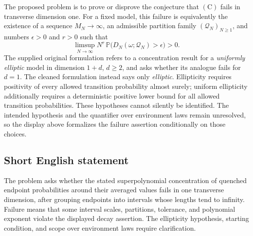 \documentclass[11pt]{article}
\begin{document}
The proposed problem is to prove or disprove the conjecture that \((\mathrm C)\) fails in transverse dimension one. For a fixed model, this failure is equivalently the existence of a sequence \(M_N\to\infty\), an admissible partition family \((\mathcal Q_N)_{N\geq1}\), and numbers \(\epsilon>0\) and \(r>0\) such that
\[
\limsup_{N\to\infty}N^r\,
\mathbb P\bigl(D_N(\omega;\mathcal Q_N)>\epsilon\bigr)>0.
\]
The supplied original formulation refers to a concentration result for a \emph{uniformly elliptic} model in dimension \(1+d\), \(d\geq2\), and asks whether its analogue fails for \(d=1\). The cleaned formulation instead says only \emph{elliptic}. Ellipticity requires positivity of every allowed transition probability almost surely; uniform ellipticity additionally requires a deterministic positive lower bound for all allowed transition probabilities. These hypotheses cannot silently be identified. The intended hypothesis and the quantifier over environment laws remain unresolved, so the display above formalizes the failure assertion conditionally on those choices.
\subsection{Short English statement}
The problem asks whether the stated superpolynomial concentration of quenched endpoint probabilities around their averaged values fails in one transverse dimension, after grouping endpoints into intervals whose lengths tend to infinity. Failure means that some interval scales, partitions, tolerance, and polynomial exponent violate the displayed decay assertion. The ellipticity hypothesis, starting condition, and scope over environment laws require clarification.
\end{document}
